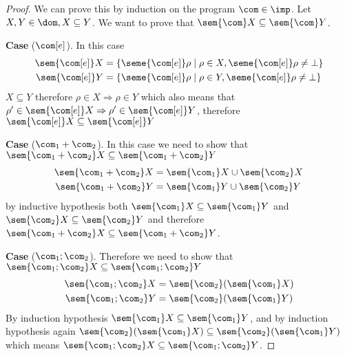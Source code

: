 \begin{proof}
  We can prove this by induction on the program \(\com\in\imp\). Let
  \(X, Y\in\dom, X \subseteq Y\). We want to prove that
  \(\sem{\com}X \subseteq \sem{\com}Y\).

  \medskip

  \noindent
  \textbf{Case} (\(\com[e]\)). In this case
  \begin{align*}
    \sem{\com[e]}X & = \{\seme{\com[e]}\rho \mid \rho \in X , \seme{\com[e]}\rho \neq \bot\} \\
    \sem{\com[e]}Y & = \{\seme{\com[e]}\rho \mid \rho \in Y , \seme{\com[e]}\rho \neq \bot\}
  \end{align*}
  \(X\subseteq Y\) therefore \(\rho \in X \Rightarrow \rho \in Y\)
  which also means that
  \(\rho' \in \sem{\com[e]}X \Rightarrow \rho' \in \sem{\com[e]}Y\),
  therefore \(\sem{\com[e]}X \subseteq \sem{\com[e]}Y\)

  \medskip

  \noindent
  \textbf{Case} (\(\com_1 + \com_2\)). In this case we need
  to show that \(\sem{\com_1+\com_2}X \subseteq \sem{\com_1+\com_2}Y \)
  \begin{align*}
    \sem{\com_1 + \com_2}X & = \sem{\com_1}X \cup \sem{\com_2}X \\
    \sem{\com_1 + \com_2}Y & = \sem{\com_1}Y \cup \sem{\com_2}Y
  \end{align*}
  by inductive hypothesis both
  \(\sem{\com_1}X \subseteq \sem{\com_1}Y\) and
  \(\sem{\com_2}X \subseteq \sem{\com_2}Y\) and therefore
  \(\sem{\com_1 + \com_2}X \subseteq \sem{\com_1 + \com_2}Y\).

  \medskip

  \noindent
  \textbf{Case} (\(\com_1 ; \com_2\)). Therefore we need to show that
  \(\sem{\com_1;\com_2}X \subseteq \sem{\com_1;\com_2}Y \)
  \begin{align*}
    \sem{\com_1 ; \com_2}X & = \sem{\com_2}(\sem{\com_1}X) \\
    \sem{\com_1 ; \com_2}Y & = \sem{\com_2}(\sem{\com_1}Y)
  \end{align*}
  By induction hypothesis
  \(\sem{\com_1} X \subseteq \sem{\com_1}Y\), and by induction
  hypothesis again
  \(\sem{\com_2}(\sem{\com_1} X) \subseteq \sem{\com_2}(\sem{\com_1}
  Y)\) which means
  \(\sem{\com_1 ; \com_2} X \subseteq \sem{\com_1 ; \com_2}Y\).

  \medskip


\end{proof}

